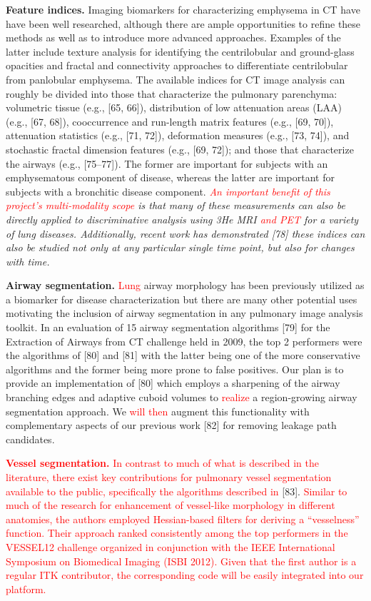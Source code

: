 \documentclass[11pt,]{article}
\begin{document}
\textbf{Feature indices.} Imaging biomarkers for characterizing
emphysema in CT have have been well researched, although there are ample
opportunities to refine these methods as well as to introduce more
advanced approaches. Examples of the latter include texture analysis for
identifying the centrilobular and ground-glass opacities and fractal and
connectivity approaches to differentiate centrilobular from panlobular
emphysema. The available indices for CT image analysis can roughly be
divided into those that characterize the pulmonary parenchyma:
volumetric tissue (e.g., {[}65, 66{]}), distribution of low attenuation
areas (LAA) (e.g., {[}67, 68{]}), cooccurrence and run-length matrix
features (e.g., {[}69, 70{]}), attenuation statistics (e.g., {[}71,
72{]}), deformation measures (e.g., {[}73, 74{]}), and stochastic
fractal dimension features (e.g., {[}69, 72{]}); and those that
characterize the airways (e.g., {[}75--77{]}). The former are important
for subjects with an emphysematous component of disease, whereas the
latter are important for subjects with a bronchitic disease component.
\emph{\textcolor{red}{An important benefit of this
project's multi-modality scope} is that many of these measurements can
also be directly applied to discriminative analysis using 3He MRI
\textcolor{red}{and PET} for a variety of lung diseases. Additionally,
recent work has demonstrated {[}78{]} these indices can also be studied
not only at any particular single time point, but also for changes with
time.}

\textbf{Airway segmentation.} \textcolor{red}{Lung} airway morphology
has been previously utilized as a biomarker for disease characterization
but there are many other potential uses motivating the inclusion of
airway segmentation in any pulmonary image analysis toolkit. In an
evaluation of 15 airway segmentation algorithms {[}79{]} for the
Extraction of Airways from CT challenge held in 2009, the top 2
performers were the algorithms of {[}80{]} and {[}81{]} with the latter
being one of the more conservative algorithms and the former being more
prone to false positives. Our plan is to provide an implementation of
{[}80{]} which employs a sharpening of the airway branching edges and
adaptive cuboid volumes to \textcolor{red}{realize} a region-growing
airway segmentation approach. We \textcolor{red}{will then} augment this
functionality with complementary aspects of our previous work {[}82{]}
for removing leakage path candidates.

\textbf{\textcolor{red}{Vessel segmentation.}}
\textcolor{red}{In contrast to much of what is described in the literature, there exist
key contributions for pulmonary vessel segmentation available to the public, specifically
the algorithms described in} {[}83{]}.
\textcolor{red}{Similar to much of the
research for enhancement of vessel-like morphology in different anatomies, the authors
employed Hessian-based filters for deriving a ``vesselness'' function.
Their approach ranked consistently among the top performers in the
VESSEL12 challenge organized in conjunction with the IEEE International Symposium on
Biomedical Imaging (ISBI 2012).  Given that the first author is a regular
ITK contributor, the corresponding code will be easily integrated into our platform.
}
\end{document}
